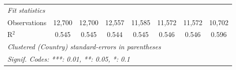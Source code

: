 \begin{tabular}{lccccccc}
   \midrule \emph{Fit statistics}\\
   Observations                                                      & 12,700         & 12,700        & 12,557         & 11,585         & 11,572         & 11,572         & 10,702\\  
   R$^2$                                                             & 0.545          & 0.545         & 0.544          & 0.545          & 0.546          & 0.546          & 0.596\\  
   \midrule
   \multicolumn{8}{l}{\emph{Clustered (Country) standard-errors in parentheses}}\\
   \multicolumn{8}{l}{\emph{Signif. Codes: ***: 0.01, **: 0.05, *: 0.1}}\\
\end{tabular}
\par\endgroup



